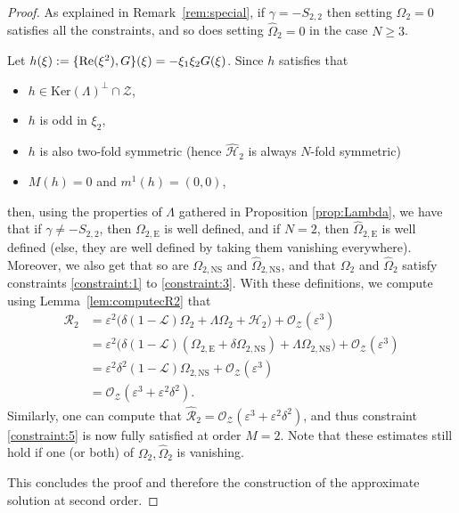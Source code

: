 \documentclass[11pt,reqno,a4paper]{amsart}
\def\eps{\varepsilon}
\def\Re{{\rm Re}}
\newcommand{\cH}{\mathcal{H}}
\newcommand{\cL}{\mathcal{L}}
\newcommand{\cO}{\mathcal{O}}
\newcommand{\cR}{\mathcal{R}}
\newcommand{\cZ}{\mathcal{Z}}
\newcommand{\1}{\mathbbm{1}}
\theoremstyle{definition}
\theoremstyle{definition}
\numberwithin{equation}{section}
\begin{document}
\begin{proof}
As explained in Remark~\ref{rem:special}, if $\gamma = -S_{2,2}$ then setting $\Omega_2 = 0$ satisfies all the constraints, and so does setting $\widehat{\Omega}_2 = 0$ in the case $N \ge 3$.

Let $h(\xi) := \{ \Re(\xi^2),G\}(\xi) = -\xi_1\xi_2 G(\xi)$. Since $h$ satisfies that
\begin{itemize}
    \item $h \in \mathrm{Ker}(\Lambda)^{\perp}\cap \cZ$,
    \item $h$ is odd in $\xi_2$,
    \item $h$ is also two-fold symmetric (hence $\widehat{\cH}_2$ is always $N$-fold symmetric)
    \item $M(h) = 0$ and $m^1(h) = (0,0)$,
\end{itemize}
then, using the properties of $\Lambda$ gathered in Proposition \ref{prop:Lambda}, we have that if $\gamma \neq - S_{2,2}$, then $\Omega_{2,\mathrm{E}}$ is well defined, and if $N =2$, then $\widehat{\Omega}_{2,\mathrm{E}}$ is well defined (else, they are well defined by taking them vanishing everywhere). Moreover, we also get that so are $\Omega_{2,\mathrm{NS}}$ and $\widehat{\Omega}_{2,\mathrm{NS}}$, and that $\Omega_2$ and $\widehat{\Omega}_2$ satisfy constraints \ref{constraint:1} to \ref{constraint:3}. With these definitions, we compute using Lemma~\ref{lem:computecR2} that
\begin{align}
    \cR_2 &  = \eps^2 \Big( \delta ( 1-\cL) \Omega_2 + \Lambda \Omega_2 + \cH_2\Big) + \cO_\cZ(\eps^3) \\
    & =  \eps^2 \Big( \delta ( 1-\cL) (\Omega_{2,\mathrm{E}} + \delta\Omega_{2,\mathrm{NS}}) + \Lambda \Omega_{2,\mathrm{NS}}\Big) + \cO_\cZ(\eps^3) \\
    & = \eps^2 \delta^2 (1-\cL) \Omega_{2,\mathrm{NS}} +  \cO_\cZ(\eps^3)  \\
    & = \cO_\cZ(\eps^3 + \eps^2 \delta^2).
\end{align}
Similarly, one can compute that $\widehat{\cR}_2 = \cO_\cZ(\eps^3 + \eps^2 \delta^2)$, and thus constraint \ref{constraint:5} is now fully satisfied at order $M=2$. Note that these estimates still hold if one (or both) of $\Omega_2,\widehat{\Omega}_2$ is vanishing.

This concludes the proof and therefore the construction of the approximate solution at second order.
\end{proof}
\end{document}
